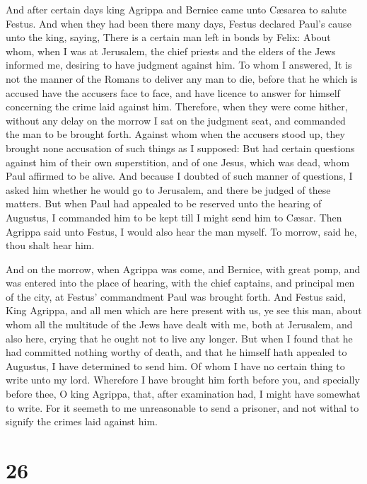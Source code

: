  And after certain days king Agrippa and Bernice came
unto Cæsarea to salute Festus.  And when they had been
there many days, Festus declared Paul's cause unto the king, saying,
There is a certain man left in bonds by Felix:  About
whom, when I was at Jerusalem, the chief priests and the elders of the
Jews informed me, desiring to have judgment against him. 
To whom I answered, It is not the manner of the Romans to deliver any
man to die, before that he which is accused have the accusers face to
face, and have licence to answer for himself concerning the crime laid
against him.  Therefore, when they were come hither,
without any delay on the morrow I sat on the judgment seat, and
commanded the man to be brought forth.  Against whom when
the accusers stood up, they brought none accusation of such things as I
supposed:  But had certain questions against him of their
own superstition, and of one Jesus, which was dead, whom Paul affirmed
to be alive.  And because I doubted of such manner of
questions, I asked him whether he would go to Jerusalem, and there be
judged of these matters.  But when Paul had appealed to
be reserved unto the hearing of Augustus, I commanded him to be kept
till I might send him to Cæsar.  Then Agrippa said unto
Festus, I would also hear the man myself. To morrow, said he, thou shalt
hear him.

 And on the morrow, when Agrippa was come, and Bernice,
with great pomp, and was entered into the place of hearing, with the
chief captains, and principal men of the city, at Festus' commandment
Paul was brought forth.  And Festus said, King Agrippa,
and all men which are here present with us, ye see this man, about whom
all the multitude of the Jews have dealt with me, both at Jerusalem, and
also here, crying that he ought not to live any longer. 
But when I found that he had committed nothing worthy of death, and that
he himself hath appealed to Augustus, I have determined to send him.
 Of whom I have no certain thing to write unto my lord.
Wherefore I have brought him forth before you, and specially before
thee, O king Agrippa, that, after examination had, I might have somewhat
to write.  For it seemeth to me unreasonable to send a
prisoner, and not withal to signify the crimes laid against him.

\hypertarget{section-25}{%
\section{26}\label{section-25}}

